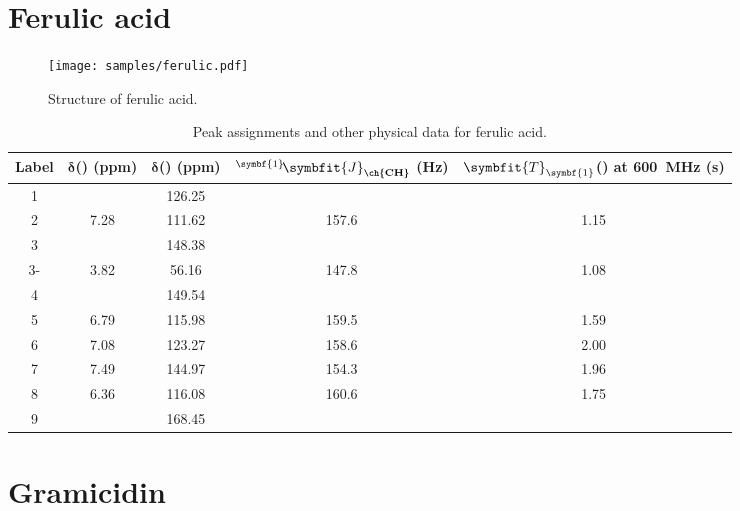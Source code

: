 \clearpage

\section{Ferulic acid}

\begin{figure}[!ht]
    \centering
    \texttt{[image: samples/ferulic.pdf]}%
    \caption[Structure of ferulic acid]{
        Structure of ferulic acid.
    }
    \label{fig:samples_ferulic}
\end{figure}

\begin{table}[!ht] \begin{tabular}{cSSSS}
        \toprule
        \textbf{Label} & {$\symbf{\delta}$\textbf{(\proton{}) (ppm)}} & {$\symbf{\delta}$\textbf{(\carbon{}) (ppm)}} & {${}^{\symbf{1}}\!\symbfit{J}_{\textbf{\ch{CH}}}$ \textbf{(Hz)}} & {$\symbfit{T}_{\symbf{1}}$\textbf{(\proton{}) at \qty{600}{MHz} (s)}} \\
                   &      & 126.25 &       &      \\
        2           & 7.28 & 111.62 & 157.6 & 1.15 \\
        3           &      & 148.38 &       &      \\
        3- & 3.82 & 56.16  & 147.8 & 1.08 \\
        4           &      & 149.54 &       &      \\
        5           & 6.79 & 115.98 & 159.5 & 1.59 \\
        6           & 7.08 & 123.27 & 158.6 & 2.00 \\
        7           & 7.49 & 144.97 & 154.3 & 1.96 \\
        8           & 6.36 & 116.08 & 160.6 & 1.75 \\
        9           &      & 168.45 &       &      \\
        \bottomrule
    \end{tabular}
    \caption[Peak assignments for ferulic acid]{
        Peak assignments and other physical data for ferulic acid.
    }
    \label{tbl:ferulic_assignments}
\end{table}

\clearpage

\section{Gramicidin}

